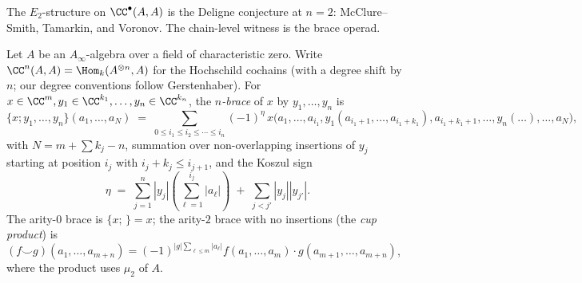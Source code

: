 The $E_2$-structure on $\CC^\bullet(A,A)$ is the Deligne conjecture at $n = 2$: McClure--Smith, Tamarkin, and Voronov. The chain-level witness is the brace operad.

\begin{definition}
\label{def:brace-operations}
Let $A$ be an $A_\infty$-algebra over a field of characteristic zero. Write $\CC^n(A,A) = \Hom_k(A^{\otimes n}, A)$ for the Hochschild cochains (with a degree shift by $n$; our degree conventions follow Gerstenhaber). For $x \in \CC^m, y_1 \in \CC^{k_1}, \ldots, y_n \in \CC^{k_n}$, the \emph{$n$-brace} of $x$ by $y_1, \ldots, y_n$ is
\begin{equation}\label{eq:hoch-brace-explicit}
 \{x; y_1, \ldots, y_n\}(a_1, \ldots, a_N)
 \;=\;
 \sum_{0 \leq i_1 \leq i_2 \leq \cdots \leq i_n} (-1)^\eta\,
 x\bigl(a_1, \ldots, a_{i_1}, y_1(a_{i_1+1}, \ldots, a_{i_1+k_1}),
 a_{i_1+k_1+1}, \ldots, y_n(\ldots), \ldots, a_N\bigr),
\end{equation}
with $N = m + \sum k_j - n$, summation over non-overlapping insertions of $y_j$ starting at position $i_j$ with $i_j + k_j \leq i_{j+1}$, and the Koszul sign
\[
 \eta \;=\; \sum_{j=1}^n |y_j|\!\left(\sum_{\ell = 1}^{i_j} |a_\ell|\right)
 \;+\; \sum_{j < j'} |y_j| |y_{j'}|.
\]
The arity-$0$ brace is $\{x; \,\} = x$; the arity-$2$ brace with no insertions (the \emph{cup product}) is $(f \smile g)(a_1, \ldots, a_{m+n}) = (-1)^{|g| \sum_{\ell \leq m} |a_\ell|} f(a_1, \ldots, a_m) \cdot g(a_{m+1}, \ldots, a_{m+n})$, where the product uses $\mu_2$ of $A$.
\end{definition}

